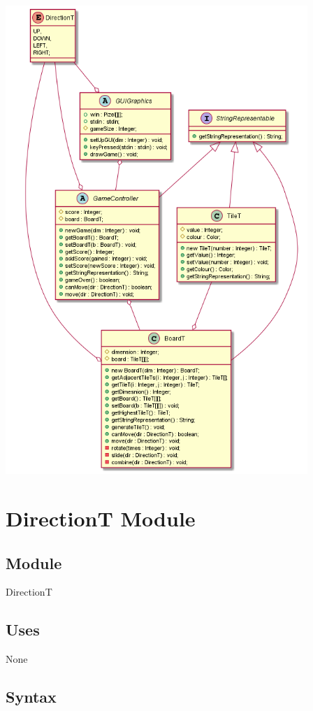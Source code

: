 \documentclass[12pt]{article}
\begin{document}
\includegraphics[width=4.5in]{2048_UML.png}

\newpage

\section* {DirectionT Module}

\subsection*{Module}

DirectionT

\subsection* {Uses}

None

\subsection* {Syntax}
\end{document}
